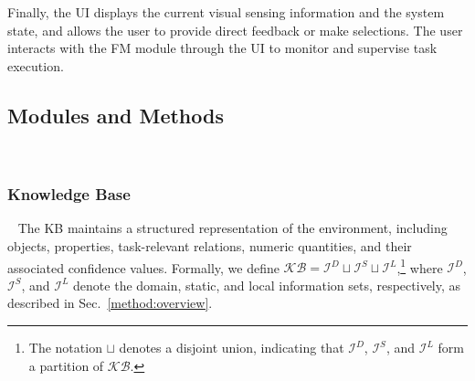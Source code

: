
Finally, the UI displays the current visual sensing information and the system state, and allows the user to provide direct feedback or make selections. The user interacts with the FM module through the UI to monitor and supervise task execution.




\subsection{Modules and Methods}~\label{method:modules}
\subsubsection{Knowledge Base}~\label{method:KB}
The KB maintains a structured representation of the environment, including objects, properties, task-relevant relations, numeric quantities, and their associated confidence values. Formally, we define $\mathcal{KB} = \mathcal{I}^{D} \sqcup \mathcal{I}^{S} \sqcup \mathcal{I}^{L}$,\footnote{The notation $\sqcup$ denotes a disjoint union, indicating that $\mathcal{I}^{D}$, $\mathcal{I}^{S}$, and $\mathcal{I}^{L}$ form a partition of $\mathcal{KB}$.} where $\mathcal{I}^{D}$, $\mathcal{I}^{S}$, and $\mathcal{I}^{L}$ denote the domain, static, and local information sets, respectively, as described in Sec.~\ref{method:overview}.

